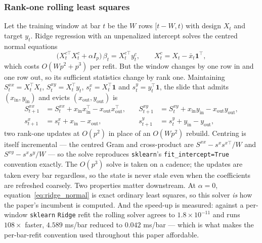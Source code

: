 \subsubsection{Rank-one rolling least squares}

Let the training window at bar $t$ be the $W$ rows $[t-W, t)$ with design $X_t$
and target $y_t$. Ridge regression with an unpenalized intercept
\citep{HoerlKennard1970} solves the centred normal equations
\begin{equation}
\bigl( X_t^{c\top} X_t^{c} + \alpha I_p \bigr)\,\beta_t = X_t^{c\top} y_t^{c},
\qquad X_t^{c} = X_t - \bar{x}_t \mathbf{1}^{\top},
\label{eq:ridge_normal}
\end{equation}
which costs $O(Wp^2 + p^3)$ per refit. But the window changes by one row in and
one row out, so its sufficient statistics change by rank one. Maintaining
$S^{xx}_t = X_t^\top X_t$, $S^{xy}_t = X_t^\top y_t$, $s^{x}_t = X_t^\top
\mathbf{1}$ and $s^{y}_t = y_t^\top \mathbf{1}$, the slide that admits
$(x_{\mathrm{in}}, y_{\mathrm{in}})$ and evicts $(x_{\mathrm{out}},
y_{\mathrm{out}})$ is
\begin{equation}
\begin{aligned}
S^{xx}_{t+1} &= S^{xx}_t + x_{\mathrm{in}} x_{\mathrm{in}}^\top - x_{\mathrm{out}} x_{\mathrm{out}}^\top,
&\quad
S^{xy}_{t+1} &= S^{xy}_t + x_{\mathrm{in}} y_{\mathrm{in}} - x_{\mathrm{out}} y_{\mathrm{out}}, \\
s^{x}_{t+1} &= s^{x}_t + x_{\mathrm{in}} - x_{\mathrm{out}},
&\quad
s^{y}_{t+1} &= s^{y}_t + y_{\mathrm{in}} - y_{\mathrm{out}},
\end{aligned}
\label{eq:rank1_update}
\end{equation}
two rank-one updates at $O(p^2)$ in place of an $O(Wp^2)$ rebuild. Centring is
itself incremental --- the centred Gram and cross-product are $S^{xx} - s^{x}
s^{x\top}/W$ and $S^{xy} - s^{x} s^{y}/W$ --- so the solve reproduces
\texttt{sklearn}'s \texttt{fit\_intercept=True} convention exactly. The $O(p^3)$
solve is taken on a cadence; the updates are taken every bar regardless, so the
state is never stale even when the coefficients are refreshed coarsely. Two
properties matter downstream. At $\alpha = 0$, equation~\eqref{eq:ridge_normal} is
exact ordinary least squares, so this solver \emph{is} how the paper's incumbent is
computed. And the speed-up is measured: against a per-window \texttt{sklearn}
\texttt{Ridge} refit the rolling solver agrees to $1.8 \times 10^{-11}$ and runs
$108\times$ faster, $4.589$ ms/bar reduced to $0.042$ ms/bar --- which is what
makes the per-bar-refit convention used throughout this paper affordable.

